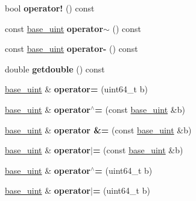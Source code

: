 \begin{DoxyCompactItemize}
bool {\bfseries operator!} () const
\item 
\mbox{\label{classbase__uint_a2803d039b33d5570f47ac39d797bc9ea}} 
const \mbox{\hyperlink{classbase__uint}{base\+\_\+uint}} {\bfseries operator$\sim$} () const
\item 
\mbox{\label{classbase__uint_a3b758876b828c6faffdc2a2880122595}} 
const \mbox{\hyperlink{classbase__uint}{base\+\_\+uint}} {\bfseries operator-\/} () const
\item 
\mbox{\label{classbase__uint_ac989d44cd0d60e6c510722a714b817fa}} 
double {\bfseries getdouble} () const
\item 
\mbox{\label{classbase__uint_a115a5ddb2f2637e09703a25cfc580483}} 
\mbox{\hyperlink{classbase__uint}{base\+\_\+uint}} \& {\bfseries operator=} (uint64\+\_\+t b)
\item 
\mbox{\label{classbase__uint_ad5ec10977ebeab115fe857637990e267}} 
\mbox{\hyperlink{classbase__uint}{base\+\_\+uint}} \& {\bfseries operator$^\wedge$=} (const \mbox{\hyperlink{classbase__uint}{base\+\_\+uint}} \&b)
\item 
\mbox{\label{classbase__uint_ae2a17c19cd8f9f6dde651db0e0fc531a}} 
\mbox{\hyperlink{classbase__uint}{base\+\_\+uint}} \& {\bfseries operator \&=} (const \mbox{\hyperlink{classbase__uint}{base\+\_\+uint}} \&b)
\item 
\mbox{\label{classbase__uint_ab116d89cbae68b32fbecf5d1de98bb2e}} 
\mbox{\hyperlink{classbase__uint}{base\+\_\+uint}} \& {\bfseries operator$\vert$=} (const \mbox{\hyperlink{classbase__uint}{base\+\_\+uint}} \&b)
\item 
\mbox{\label{classbase__uint_a3d77324f5c5166e4dabadac360bea6e7}} 
\mbox{\hyperlink{classbase__uint}{base\+\_\+uint}} \& {\bfseries operator$^\wedge$=} (uint64\+\_\+t b)
\item 
\mbox{\label{classbase__uint_ac8edb6e097d9eede21f8fa44e9184913}} 
\mbox{\hyperlink{classbase__uint}{base\+\_\+uint}} \& {\bfseries operator$\vert$=} (uint64\+\_\+t b)
\item 

\end{DoxyCompactItemize}
